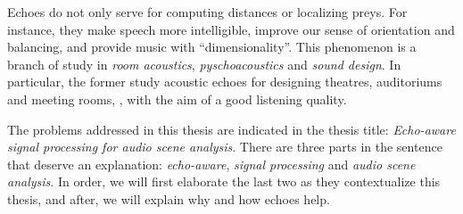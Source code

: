\mynewline
Echoes do not only serve for computing distances or localizing preys.
For instance, they make speech more intelligible, improve our sense of orientation and balancing, and provide music with ``dimensionality''.
This phenomenon is a branch of study in \textit{room acoustics}, \textit{pyschoacoustics} and \textit{sound design}.
In particular, the former study acoustic echoes for designing theatres, auditoriums and meeting rooms, , with the aim of a good listening quality.

\mynewline
The problems addressed in this thesis are indicated in the thesis title: \textit{Echo-aware signal processing for audio scene analysis}.
There are three parts in the sentence that deserve an explanation: \textit{echo-aware}, \textit{signal processing} and \textit{audio scene analysis}.
In order, we will first elaborate the last two as they contextualize this thesis, and after, we will explain why and how echoes help.


